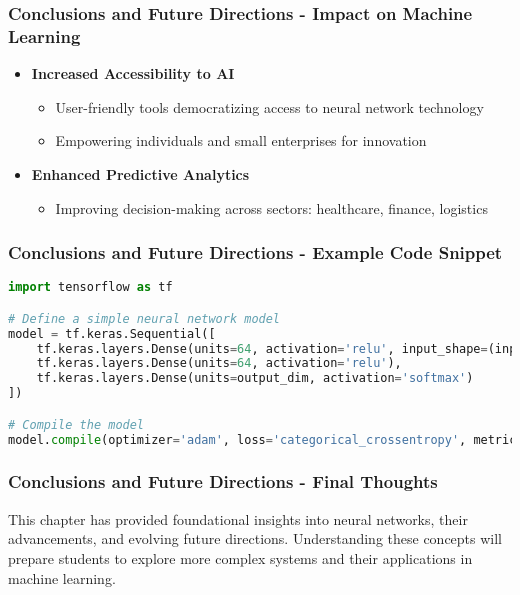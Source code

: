 \documentclass[aspectratio=169]{beamer}
\begin{document}
\begin{frame}[fragile]
    \frametitle{Conclusions and Future Directions - Impact on Machine Learning}
    \begin{itemize}
        \item \textbf{Increased Accessibility to AI}
        \begin{itemize}
            \item User-friendly tools democratizing access to neural network technology
            \item Empowering individuals and small enterprises for innovation
        \end{itemize}

        \item \textbf{Enhanced Predictive Analytics}
        \begin{itemize}
            \item Improving decision-making across sectors: healthcare, finance, logistics
        \end{itemize}
    \end{itemize}
\end{frame}

\begin{frame}[fragile]
    \frametitle{Conclusions and Future Directions - Example Code Snippet}
    \begin{lstlisting}[language=Python]
import tensorflow as tf

# Define a simple neural network model
model = tf.keras.Sequential([
    tf.keras.layers.Dense(units=64, activation='relu', input_shape=(input_dim,)),
    tf.keras.layers.Dense(units=64, activation='relu'),
    tf.keras.layers.Dense(units=output_dim, activation='softmax')
])

# Compile the model
model.compile(optimizer='adam', loss='categorical_crossentropy', metrics=['accuracy'])
    \end{lstlisting}
\end{frame}

\begin{frame}[fragile]
    \frametitle{Conclusions and Future Directions - Final Thoughts}
    This chapter has provided foundational insights into neural networks, their advancements, 
    and evolving future directions. Understanding these concepts will prepare students to explore 
    more complex systems and their applications in machine learning.
\end{frame}
\end{document}
